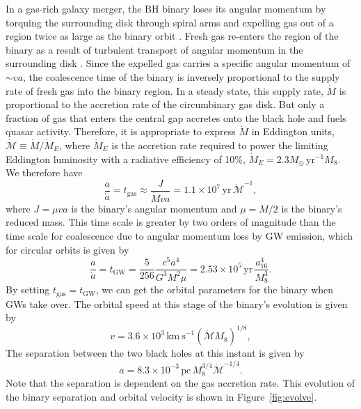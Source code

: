 \documentclass[iop]{emulateapj}
\begin{document}
In a gas-rich galaxy merger, the BH binary loses its angular
momentum by torquing the surrounding disk through spiral arms and
expelling gas out of a region twice as large as the binary orbit
\citep{2005ApJ...622L..93M, 2007PASJ...59..427H, 2008ApJ...672...83M,
  2009MNRAS.393.1423C}.  Fresh gas re-enters the region of the binary
as a result of turbulent transport of angular momentum in the
surrounding disk \citep{2008ApJ...672...83M, 2012ApJ...755...51N,
  2012MNRAS.427.2680K, 2012A&A...545A.127R}.  Since the expelled gas
carries a specific angular momentum of $\sim va$, the coalescence time
of the binary is inversely proportional to the supply rate of fresh
gas into the binary region.  In a steady state, this supply rate,
$\dot M$ is proportional to the accretion rate of the circumbinary gas
disk.  But only a fraction of gas that enters the central gap accretes
onto the black hole and fuels quasar activity.  Therefore, it is
appropriate to express $\dot M$ in Eddington units, $\dot{\mathcal
  M}\equiv\dot M /\dot M_E$, where $\dot M_E$ is the accretion rate
required to power the limiting Eddington luminosity with a radiative
efficiency of 10\%, $\dot M_E=2.3 M_\odot\, \mathrm{yr}^{-1}M_8$.  We
therefore have \citep{2010PhRvD..81d7503L}
\begin{equation}
  \frac{a}{\dot a} = t_\mathrm{gas}\approx\frac{J}{\dot Mva}=1.1\times 10^7\,
  \mathrm{yr}\,\dot{\mathcal M}^{-1},
\end{equation}
where $J=\mu va$ is the binary's angular momentum and $\mu=M/2$ is the
binary's reduced mass.  This time scale is greater by two orders of
magnitude than the time scale for coalescence due to angular momentum
loss by GW emission, which for circular orbits is given by
\citep{1964PhRv..136.1224P}
\begin{equation}
\frac{a}{\dot a} = t_\mathrm{GW} = \frac{5}{256}\frac{c^5a^4}{G^3M^2\mu}=2.53\times 10^5\,\mathrm{yr}\,\frac{a_{16}^4}{M_8^3}.
\end{equation}
By setting $t_\mathrm{gas}=t_\mathrm{GW}$, we can get the orbital
parameters for the binary when GWs take over.  The orbital speed at
this stage of the binary's evolution is given by
\begin{equation}
  v = 3.6\times 10^3\, \mathrm{km~s}^{-1}(\dot{\mathcal{M}}M_8)^{1/8},
  \label{eqn:v}
\end{equation}
The separation between the two black holes at this instant is given by
\begin{equation}
  a = 8.3\times 10^{-3}\, \mathrm{pc}\, M_8^{3/4}\dot{\mathcal{M}}^{-1/4}.
  \label{eqn:a}
\end{equation}
Note that the separation is dependent on the gas accretion rate.  This
evolution of the binary separation and orbital velocity is shown in
Figure~\ref{fig:evolve}.
\end{document}
